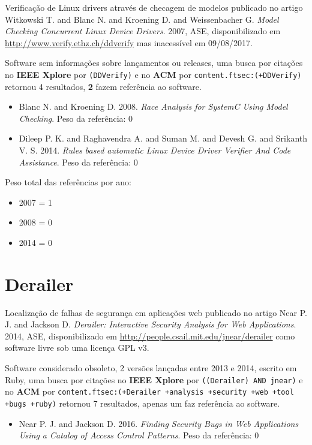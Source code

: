 Verificação de Linux drivers através de checagem de modelos
publicado no artigo
Witkowski T. and Blanc N. and Kroening D. and Weissenbacher G.
{\it Model Checking Concurrent Linux Device Drivers}.
2007,
ASE,
disponibilizado em \url{http://www.verify.ethz.ch/ddverify}
mas inacessível em 09/08/2017.

Software sem informações sobre lançamentos ou releases,
uma busca por citações no {\bf IEEE Xplore} por
\texttt{(DDVerify)}
e no {\bf ACM} por
\texttt{content.ftsec:(+DDVerify)}
retornou
4 resultados,
{\bf 2} fazem referência ao software.

\begin{itemize}
\item Blanc N. and Kroening D.
      2008.
      {\it Race Analysis for SystemC Using Model Checking}.
      Peso da referência: 0
\item Dileep P. K. and Raghavendra A. and Suman M. and Devesh G. and Srikanth V. S.
      2014.
      {\it Rules based automatic Linux Device Driver Verifier And Code Assistance}.
      Peso da referência: 0
\end{itemize}

Peso total das referências por ano:

\begin{itemize}
\item 2007 = 1
\item 2008 = 0
\item 2014 = 0
\end{itemize}


\section{Derailer}

Localização de falhas de segurança em aplicações web
publicado no artigo
Near P. J. and Jackson D.
{\it Derailer: Interactive Security Analysis for Web Applications}.
2014,
ASE,
disponibilizado em \url{http://people.csail.mit.edu/jnear/derailer}
como software livre
sob uma licença GPL v3.

Software considerado obsoleto,
2 versões lançadas
entre 2013 e 2014,
escrito em Ruby,
uma busca por citações no {\bf IEEE Xplore} por
\texttt{((Derailer) AND jnear)}
e no {\bf ACM} por
\texttt{content.ftsec:(+Derailer +analysis +security +web +tool +bugs +ruby)}
retornou
7 resultados,
apenas um faz referência ao software.

\begin{itemize}
\item Near P. J. and Jackson D.
      2016.
      {\it Finding Security Bugs in Web Applications Using a Catalog of Access Control Patterns}.
      Peso da referência: 0
\end{itemize}

